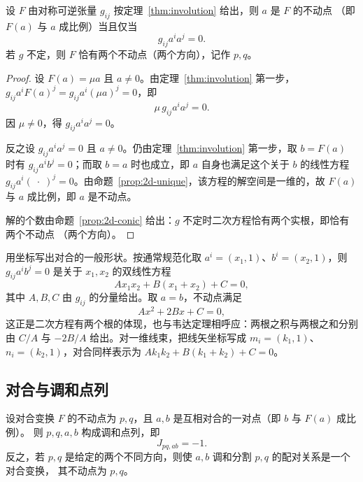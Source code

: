 \begin{proposition}[不动点]\label{prop:fixed}
设 $F$ 由对称可逆张量 $g_{ij}$ 按定理~\ref{thm:involution} 给出，则 $a$ 是 $F$ 的不动点
（即 $F(a)$ 与 $a$ 成比例）当且仅当
\[
g_{ij}a^ia^j=0 .
\]
若 $g$ 不定，则 $F$ 恰有两个不动点（两个方向），记作 $p,q$。
\end{proposition}

\begin{proof}
设 $F(a)=\mu a$ 且 $a\ne0$。由定理~\ref{thm:involution} 第一步，
$g_{ij}a^iF(a)^j=g_{ij}a^i(\mu a)^j=0$，即
\[
\mu\,g_{ij}a^ia^j=0 .
\]
因 $\mu\ne0$，得 $g_{ij}a^ia^j=0$。

反之设 $g_{ij}a^ia^j=0$ 且 $a\ne0$。仍由定理~\ref{thm:involution} 第一步，取 $b=F(a)$ 时有
$g_{ij}a^ib^j=0$；而取 $b=a$ 时也成立，即 $a$ 自身也满足这个关于 $b$ 的线性方程
$g_{ij}a^i(\;\cdot\;)^j=0$。由命题~\ref{prop:2d-unique}，该方程的解空间是一维的，故 $F(a)$ 与
$a$ 成比例，即 $a$ 是不动点。

解的个数由命题~\ref{prop:2d-conic} 给出：$g$ 不定时二次方程恰有两个实根，即恰有两个不动点
（两个方向）。
\end{proof}

用坐标写出对合的一般形状。按通常规范化取 $a^i=(x_1,1)$、$b^i=(x_2,1)$，则
$g_{ij}a^ib^j=0$ 是关于 $x_1,x_2$ 的双线性方程
\[
Ax_1x_2+B(x_1+x_2)+C=0 ,
\]
其中 $A,B,C$ 由 $g_{ij}$ 的分量给出。取 $a=b$，不动点满足
\[
Ax^2+2Bx+C=0 ,
\]
这正是二次方程有两个根的体现，也与韦达定理相呼应：两根之积与两根之和分别由 $C/A$ 与 $-2B/A$
给出。对一维线束，把线矢坐标写成 $m_i=(k_1,1)$、$n_i=(k_2,1)$，对合同样表示为
$Ak_1k_2+B(k_1+k_2)+C=0$。

\subsection{对合与调和点列}

\begin{theorem}\label{thm:inv-harmonic}
设对合变换 $F$ 的不动点为 $p,q$，且 $a,b$ 是互相对合的一对点（即 $b$ 与 $F(a)$ 成比例）。
则 $p,q,a,b$ 构成调和点列，即
\[
J_{pq,ab}=-1 .
\]
反之，若 $p,q$ 是给定的两个不同方向，则使 $a,b$ 调和分割 $p,q$ 的配对关系是一个对合变换，
其不动点为 $p,q$。
\end{theorem}

